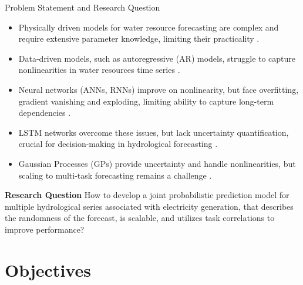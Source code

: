 \begin{frame}{Problem Statement and Research Question}
	\begin{block}{}
	\begin{itemize}
		\item Physically driven models for water resource forecasting are complex and require extensive parameter knowledge, limiting their practicality \cite{Yaseen2018, HKASHANI2016340}.
		\item Data-driven models, such as autoregressive (AR) models, struggle to capture nonlinearities in water resources time series \cite{10.2166/wst.2020.369}.
		\item Neural networks (ANNs, RNNs) improve on nonlinearity, but face overfitting, gradient vanishing and exploding, limiting ability to capture long-term dependencies \cite{Abdollahi2017, Shiau2016, KHAN2020125380}.
		\item LSTM networks overcome these issues, but lack uncertainty quantification, crucial for decision-making in hydrological forecasting \cite{lakshminarayanan2017simple, gal2016dropout}.
		\item Gaussian Processes (GPs) provide uncertainty and handle nonlinearities, but scaling to multi-task forecasting remains a challenge \cite{QUILTY2020104718, NIU2021102562,bruinsma2020scalable}.
	\end{itemize}
	\end{block}
	\begin{block}{\textbf{Research Question}}
		How to develop a joint probabilistic prediction model for multiple hydrological series associated with electricity generation, that describes the randomness of the forecast, is scalable, and utilizes task correlations to improve performance?
	\end{block}
\end{frame}


\section{Objectives}

